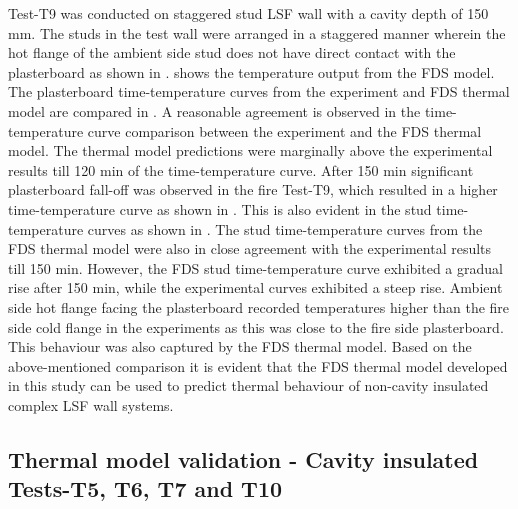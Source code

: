 Test-T9 was conducted on staggered stud LSF wall with a cavity depth of 150 mm. The studs in the test wall were arranged in a staggered manner wherein the hot flange of the ambient side stud does not have direct contact with the plasterboard as shown in .  shows the temperature output from the FDS model. The plasterboard time-temperature curves from the experiment and FDS thermal model are compared in . A reasonable agreement is observed in the time-temperature curve comparison between the experiment and the FDS thermal model. The thermal model predictions were marginally above the experimental results till 120 min of the time-temperature curve. After 150 min significant plasterboard fall-off was observed in the fire Test-T9, which resulted in a higher time-temperature curve as shown in . This is also evident in the stud time-temperature curves as shown in . The stud time-temperature curves from the FDS thermal model were also in close agreement with the experimental results till 150 min. However, the FDS stud time-temperature curve exhibited a gradual rise after 150 min, while the experimental curves exhibited a steep rise. Ambient side hot flange facing the plasterboard recorded temperatures higher than the fire side cold flange in the experiments as this was close to the fire side plasterboard. This behaviour was also captured by the FDS thermal model. Based on the above-mentioned comparison it is evident that the FDS thermal model developed in this study can be used to predict thermal behaviour of non-cavity insulated complex LSF wall systems. 

\subsection{Thermal model validation - Cavity insulated Tests-T5, T6, T7 and T10}\label{sec:fds-cavity-models}

